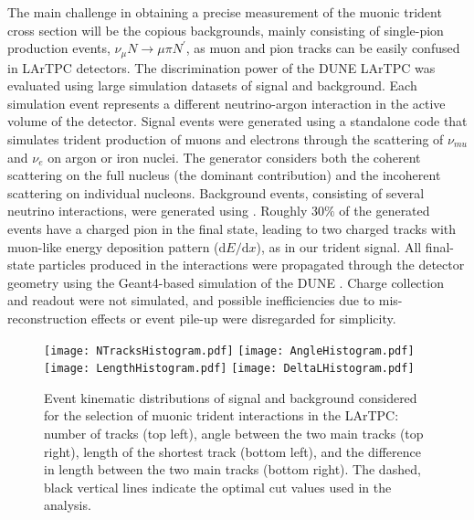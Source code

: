 The main challenge in obtaining a precise measurement of the muonic trident cross section will be the copious backgrounds, mainly consisting of  single-pion production events, $\nu_\mu N \to \mu \pi N^\prime$, as muon and pion tracks can be easily confused in LArTPC detectors. The discrimination power of the DUNE  LArTPC was evaluated using large simulation datasets of signal and background. Each simulation event represents a different neutrino-argon interaction in the active volume of the detector. Signal events were generated using a standalone code \cite{} that simulates trident production of muons and electrons through the scattering of $\nu_{mu}$ and $\nu_e$ on argon or iron nuclei. The generator considers both the coherent scattering on the full nucleus (the dominant contribution) and the incoherent scattering on individual nucleons. Background events, consisting of several  neutrino interactions, were generated using . Roughly $30\%$ of the generated events have a charged pion in the final state, leading to two charged tracks with muon-like energy deposition pattern ($\mathrm{d}E/\mathrm{d}x$), as in our trident signal. All final-state particles produced in the interactions were propagated through the detector geometry using the Geant4-based \cite{Agostinelli:2002hh,Allison:2006ve,Allison:2016lfl} simulation of the DUNE . Charge collection and readout were not simulated, and possible inefficiencies due to mis-reconstruction effects or event pile-up were disregarded for simplicity.

\begin{figure}[!tb]
\centering
\texttt{[image: NTracksHistogram.pdf]}
\texttt{[image: AngleHistogram.pdf]} \\[0.75\baselineskip]
\texttt{[image: LengthHistogram.pdf]}
\texttt{[image: DeltaLHistogram.pdf]}
\caption[Kinematic distributions of signal and background considered for the selection of muonic trident interactions in the  LArTPC]{Event kinematic distributions of signal and background considered for the selection of muonic trident interactions in the  LArTPC: number of tracks (top left), angle between the two main tracks (top right), length of the shortest track (bottom left), and the difference in length between the two main tracks (bottom right). The dashed, black vertical lines indicate the optimal cut values used in the analysis.} \label{fig:trident_kinematics}
\end{figure}

